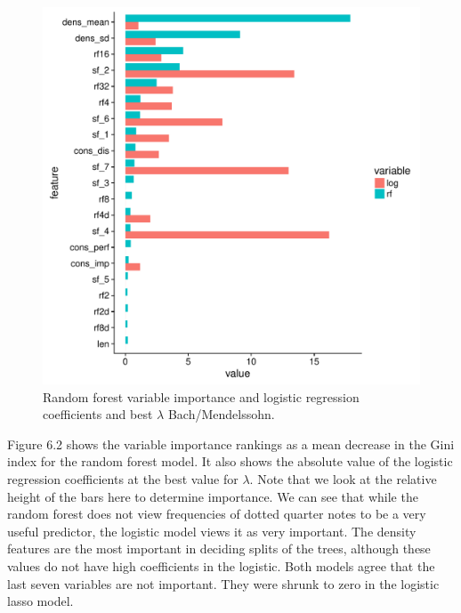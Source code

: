 \documentclass[12pt,twoside]{reedthesis}
\theoremstyle{definition}
\theoremstyle{definition}
\theoremstyle{definition}
\theoremstyle{remark}
\begin{document}
\begin{figure}[H]
\centering
\includegraphics[scale = .5]{images/var_imp_rflog_b.pdf}
\caption{Random forest variable importance and logistic regression coefficients and best $\lambda$ Bach/Mendelssohn.}
\label{subd}
\end{figure}
Figure 6.2 shows the variable importance rankings as a mean decrease in
the Gini index for the random forest model. It also shows the absolute
value of the logistic regression coefficients at the best value for
\(\lambda\). Note that we look at the relative height of the bars here
to determine importance. We can see that while the random forest does
not view frequencies of dotted quarter notes to be a very useful
predictor, the logistic model views it as very important. The density
features are the most important in deciding splits of the trees,
although these values do not have high coefficients in the logistic.
Both models agree that the last seven variables are not important. They
were shrunk to zero in the logistic lasso model.
\end{document}
